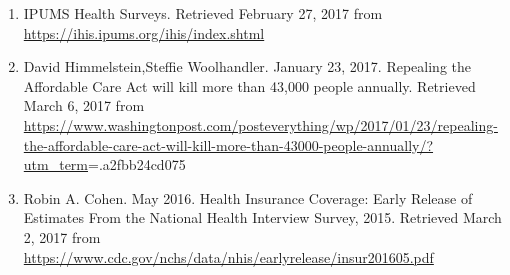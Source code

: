 \documentclass[10pt,]{article}
\begin{document}
\begin{enumerate}
\def\labelenumi{\arabic{enumi}.}
\item
  IPUMS Health Surveys. Retrieved February 27, 2017 from
  \url{https://ihis.ipums.org/ihis/index.shtml}
\item
  David Himmelstein,Steffie Woolhandler. January 23, 2017. Repealing the
  Affordable Care Act will kill more than 43,000 people annually.
  Retrieved March 6, 2017 from
  \url{https://www.washingtonpost.com/posteverything/wp/2017/01/23/repealing-the-affordable-care-act-will-kill-more-than-43000-people-annually/?utm_term}=.a2fbb24cd075
\item
  Robin A. Cohen. May 2016. Health Insurance Coverage: Early Release of
  Estimates From the National Health Interview Survey, 2015. Retrieved
  March 2, 2017 from
  \url{https://www.cdc.gov/nchs/data/nhis/earlyrelease/insur201605.pdf}
\end{enumerate}
\newpage
\singlespacing 
\end{document}
